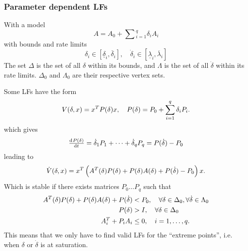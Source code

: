 \subsubsection{Parameter dependent LFs}
With a model
%
\begin{equation}
  A = A_0 + \sum­­_{i=1}^q \delta_i A_i
\end{equation}
%
with bounds and rate limits
%
\begin{equation}
  \delta_i \in [\underline\delta_i, \overline\delta_i], \quad \dot\delta_i \in [\underline\lambda_i, \overline\lambda_i ]
\end{equation}
%
The set $\Delta$ is the set of all $\delta$ within its bounds, and $\Lambda$ is the set of all $\dot\delta$ within its rate limits. $\Delta_0$ and $\Lambda_0$ are their respective vertex sets.

Some LFs have the form
%
\begin{equation}
  V(\delta,x) = x^{T} P(\delta)x,\quad P(\delta) = P_0 + \sum_{i=1}^q \delta_i P_i.
\end{equation}
%
which gives
%
\begin{equation}
  \od{P(\delta)}{t} = \dot\delta_1 P_1 + \dots + \dot\delta_q P_q = P(\dot\delta) - P_0
\end{equation}
%
leading to
%
\begin{equation}
  \dot{V}(\delta,x) = x^{T} \left(A^{T}(\delta) P(\delta) + P(\delta) A(\delta) + P(\dot{\delta}) - P_0 \right)x.
\end{equation}
%
Which is stable if there exists matrices $P_0 \dots P_q$ such that
%
\begin{equation}
  \begin{split}
    A^{T}(\delta)P(\delta) + P(\delta)A(\delta) + P(\dot\delta) &< P_0, \quad \forall \delta \in \Delta_0, \forall \dot\delta \in \Lambda_0 \\
    P(\delta) &> I, \quad \forall \delta \in \Delta_0 \\
    A_i^{T} + P_iA_i &\leq 0,\quad i = 1,\dots,q.
  \end{split}
\end{equation}
%
This means that we only have to find valid LFs for the ``extreme points'', i.e. when $\delta$ or $\dot\delta$ is at saturation.

